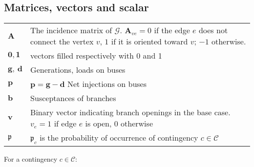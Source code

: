 \subsection*{Matrices, vectors and scalar}

\noindent
\begin{tabular}{p{1.5cm}p{6.5cm}}
    $\pmb{A}$           & The incidence matrix of $\mathcal{G}$. $\pmb{A}_{ve}=0$ if the edge $e$ does not connect the vertex $v$, $1$ if it is oriented toward $v$; $-1$ otherwise. \\
    $\pmb{0}, \pmb{1}$  & vectors filled respectively with 0 and 1                                                                                                             \\
    $\pmb{g},\ \pmb{d}$ & Generations, loads on buses                                                                                                                       \\
    $\pmb{p}$ & $\pmb{p} = \pmb{g} - \pmb{d}$ Net injections on buses                                                                                                                       \\
    $\pmb{b}$           & Susceptances of branches                                                                                                                             \\
    $\pmb{v}$           & Binary vector indicating branch openings in the base case. $v_{e}= 1$ if edge $e$ is open, 0 otherwise                                                               \\
    $\pmb{\mathfrak{p}}$      & $\mathfrak{p}_{c}$ is the probability of occurrence of contingency $c \in \mathcal{C}$                                                               \\
\end{tabular}

\noindent

\medskip
\noindent
For a contingency $c \in \mathcal{C}$:

